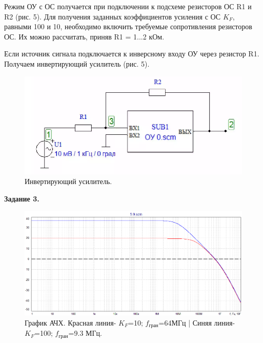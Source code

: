 \documentclass[a4paper,14pt]{extarticle}
\begin{document}
    Режим ОУ с ОС получается при подключении к подсхеме резисторов ОС R1 и 
    R2 (рис. 5). Для получения заданных коэффициентов усиления с ОС $K_F$, 
    равными 100 и 10, необходимо включить требуемые сопротивления 
    резисторов ОС. Их можно рассчитать, приняв R1 = 1...2 кОм.

    Если источник сигнала подключается к инверсному входу ОУ через
    резистор R1. Получаем инвертирующий усилитель (рис. 5).

    \begin{figure}[h!]
        \begin{center}
            \includegraphics[scale=0.5]{6.png}
        \end{center}
        \caption{Инвертирующий усилитель.}
    \end{figure}

    \begin{center}
        \textbf{Задание 3.}
    \end{center}

    \begin{figure}[h!]
        \begin{center}
            \includegraphics[scale=0.6]{7.png}
        \end{center}
        \caption{График АЧХ. Красная линия- $K_F$=10; $f_\text{гран}$=64МГц | Синяя линия- $K_F$=100; $f_\text{гран}$=9.3 МГц.}
    \end{figure}
\end{document}
